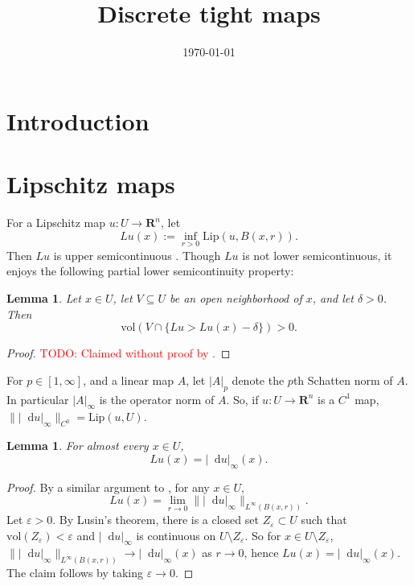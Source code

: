 \documentclass[reqno,11pt]{amsart}
\title{Discrete tight maps}
\author{}
\date{\today}
\newcommand{\RR}{\mathbf{R}}
\newcommand*\dif{\mathop{}\!\mathrm{d}}
\newcommand{\vol}{\mathrm{vol}}
\newcommand{\Lip}{\mathrm{Lip}}
\newtheorem{lemma}[theorem]{Lemma}
\theoremstyle{definition}
\numberwithin{equation}{section}
\newcommand\todo[1]{\textcolor{red}{TODO: #1}}
\begin{document}
\begin{abstract}
    
\end{abstract}

\maketitle

\section{Introduction}
\section{Lipschitz maps}
For a Lipschitz map $u: U \to \RR^n$, let
$$Lu(x) := \inf_{r > 0} \Lip(u, B(x, r)).$$
Then $Lu$ is upper semicontinuous \cite[Lemma 4.2(a)]{Crandall2008}.
Though $Lu$ is not lower semicontinuous, it enjoys the following partial lower semicontinuity property:

\begin{lemma}
Let $x \in U$, let $V \subseteq U$ be an open neighborhood of $x$, and let $\delta > 0$.
Then 
\begin{equation}\label{partial lower semicontinuity}
\vol(V \cap \{Lu > Lu(x) - \delta\}) > 0.
\end{equation}
\end{lemma}
\begin{proof}
\todo{Claimed without proof by \cite[\S1.4]{Sheffield12}.}
\end{proof}

For $p \in [1, \infty]$, and a linear map $A$, let $|A|_p$ denote the $p$th Schatten norm of $A$.
In particular $|A|_\infty$ is the operator norm of $A$.
So, if $u: U \to \RR^n$ is a $C^1$ map, $\||\dif u|_\infty\|_{C^0} = \Lip(u, U)$.

\begin{lemma}
For almost every $x \in U$,
$$Lu(x) = |\dif u|_\infty(x).$$
\end{lemma}
\begin{proof}
By a similar argument to \cite[Lemma 4.2(e)]{Crandall2008}, for any $x \in U$,
$$Lu(x) = \lim_{r \to 0} \||\dif u|_\infty\|_{L^\infty(B(x, r))}.$$
Let $\varepsilon > 0$.
By Lusin's theorem, there is a closed set $Z_\varepsilon \subset U$ such that $\vol(Z_\varepsilon) < \varepsilon$ and $|\dif u|_\infty$ is continuous on $U \setminus Z_\varepsilon$.
So for $x \in U \setminus Z_\varepsilon$, $\||\dif u|_\infty\|_{L^\infty(B(x, r))} \to |\dif u|_\infty(x)$ as $r \to 0$, hence $Lu(x) = |\dif u|_\infty(x)$.
The claim follows by taking $\varepsilon \to 0$.
\end{proof}
\end{document}
